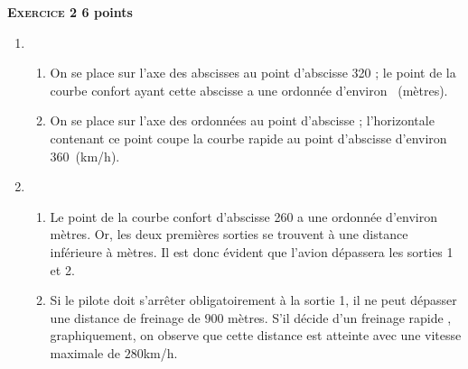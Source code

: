 \textbf{\textsc{Exercice 2} \hfill 6 points}

\medskip

\begin{enumerate}
\item 
	\begin{enumerate}
		\item On se place sur l'axe des abscisses au point d'abscisse  320 ;  le point de la courbe \og confort \fg{} ayant cette abscisse a une ordonnée  d'environ ~(mètres).
		\item On se place sur  l'axe des ordonnées au point d'abscisse  ; l'horizontale contenant ce point coupe la courbe \og rapide \fg{} au point d'abscisse d'environ $360$~(km/h).
	\end{enumerate}
\item 
	\begin{enumerate}
		\item Le point de la courbe \og confort \fg{} d'abscisse 260 a une ordonnée d'environ  mètres. Or, les
deux premières sorties se trouvent à une distance inférieure à  mètres. Il est donc évident que l'avion dépassera les sorties 1 et 2.
		\item Si le pilote doit s'arrêter obligatoirement à la sortie 1, il ne peut dépasser une distance de freinage de  $900$ mètres. S'il décide d'un freinage \og rapide \fg, graphiquement, on observe que cette distance est atteinte avec une vitesse
maximale de $280$km/h.
	\end{enumerate}
\end{enumerate}

\vspace{0,25cm}

